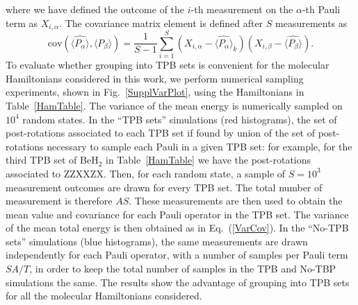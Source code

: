 \documentclass[twocolumn]{revtex4-1}
\newcommand{\1}{\mathbbm{1}}
\begin{document}
where we have defined the outcome of the $i$-th measurement on the $\alpha$-th Pauli term as $X_{i,\alpha}$. The covariance matrix element is defined after $S$ measurements as 
\begin{equation}
\label{CovDef}
{\mathrm{cov}}(\widehat{ \langle P_\alpha\rangle},\widehat{ \langle P_\beta \rangle})=\frac{1}{S-1}\sum_{i=1}^S (X_{i,\alpha}-\widehat{ \langle P_\alpha\rangle}_k)(X_{i,\beta}-\widehat{ \langle P_\beta\rangle}).
\end{equation}
To evaluate whether grouping into TPB sets is convenient for the molecular Hamiltonians considered in this work, we perform numerical sampling experiments, shown in Fig.~\ref{SupplVarPlot}, using the Hamiltonians in Table~\ref{HamTable}. The variance of the mean energy is numerically sampled on $10^4$ random states. In the ``TPB sets'' simulations (red histograms), the set of post-rotations associated to each TPB set if found by union of the set of post-rotations necessary to sample each Pauli in a given TPB set: for example, for the third TPB set of BeH$_2$ in Table~\ref{HamTable} we have the post-rotations associated to ZZXXZX. Then, for each random state, a sample of $S=10^3$ measurement outcomes are drawn for every TPB set. The total number of measurement is therefore $AS$. These measurements are then used to obtain the mean value and covariance for each Pauli operator in the TPB set. The variance of the mean total energy is then obtained as in Eq.~(\ref{VarCov}). In the ``No-TPB sets'' simulations (blue histograms), the same measurements are drawn independently for each Pauli operator, with a number of samples per Pauli term $SA/T$, in order to keep the total number of samples in the TPB and No-TBP simulations the same. The results show the advantage of grouping into TPB sets for all the molecular Hamiltonians considered.
\end{document}
